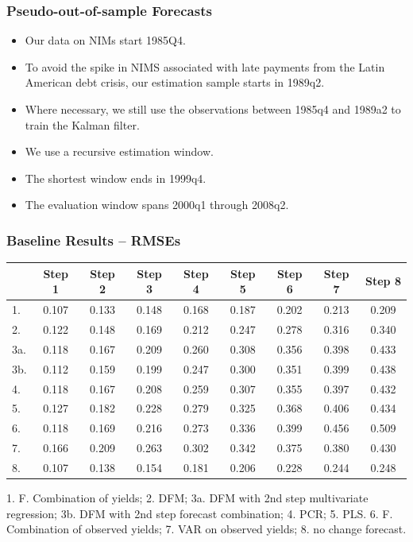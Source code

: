 \documentclass[handout]{beamer}
\begin{document}
\begin{frame}
\frametitle{Pseudo-out-of-sample Forecasts}

\begin{itemize}

\item Our data on NIMs start 1985Q4.

\item To avoid the spike in NIMS associated with late payments from the Latin American debt crisis, our estimation sample starts in 1989q2.

\item Where necessary, we still use the observations between 1985q4 and 1989a2 to train the Kalman filter.

\item We use a recursive estimation window.

\item The shortest window ends in 1999q4.

\item The evaluation window spans 2000q1 through 2008q2.

\end{itemize}

\end{frame}

\begin{frame}
\frametitle{Baseline Results -- RMSEs}
\footnotesize
\begin{table}
\center
\begin{tabular}{|l|c|c|c|c|c|c|c|c|}
\hline
&Step 1 &Step 2 &Step 3 &Step 4 &Step 5 &Step 6 &Step 7 &Step 8 \\
\hline
1.           &0.107&0.133&0.148&0.168&0.187&0.202&0.213&0.209\\
2.           &0.122&0.148&0.169&0.212&0.247&0.278&0.316&0.340\\
3a.         &0.118&0.167&0.209&0.260&0.308&0.356&0.398&0.433\\
3b.         &0.112&0.159&0.199&0.247&0.300&0.351&0.399&0.438\\
4.           &0.118&0.167&0.208&0.259&0.307&0.355&0.397&0.432\\
5.           &0.127&0.182&0.228&0.279&0.325&0.368&0.406&0.434\\
6. 	     &0.118&0.169&0.216&0.273&0.336&0.399&0.456&0.509\\
7.           &0.166&0.209&0.263&0.302&0.342&0.375&0.380&0.430\\
8.           &0.107&0.138&0.154&0.181&0.206&0.228&0.244&0.248\\
\hline
\end{tabular}
\end{table}


1. F. Combination of yields;  2. DFM; 3a. DFM with 2nd step multivariate regression; 3b. DFM with 2nd step forecast combination; 4. PCR; 5. PLS. 6. F. Combination of observed yields; 7. VAR on observed yields; 8. no change forecast.

\end{frame}
\end{document}
